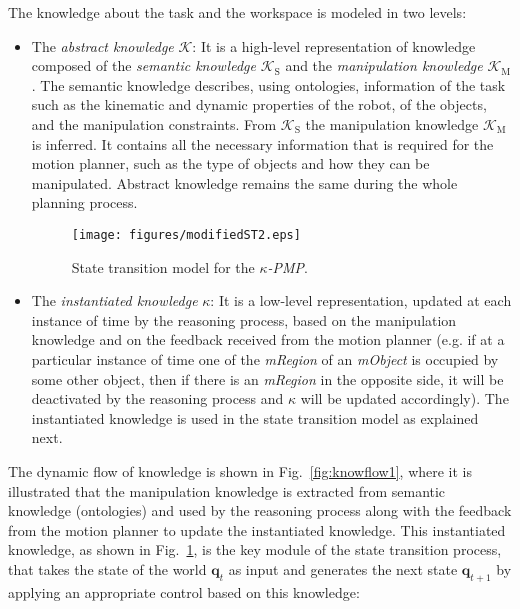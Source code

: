 \documentclass[twocolumn]{svjour3}          %
\begin{document}
The knowledge about the task and the workspace is modeled in two levels:
\begin{itemize}
\item The \textit{abstract knowledge} $\mathcal{K}$: It is a high-level representation of knowledge composed of the \textit{semantic knowledge} $\mathcal{K}_\textrm{S}$ and the  \textit{manipulation 
knowledge} $\mathcal{K}_\textrm{M}$. The semantic knowledge describes, using ontologies, information of the task such as the kinematic and dynamic properties of the robot, of the objects, and the manipulation constraints. From $\mathcal{K}_\textrm{S}$ the manipulation knowledge $\mathcal{K}_\textrm{M}$ is inferred. It contains all the necessary information that is required for the motion planner, such as the type of objects and how they can be manipulated. Abstract knowledge remains the same during the whole planning process.
\begin{figure}[t]
\begin{center}
   \texttt{[image: figures/modifiedST2.eps]}
   \caption{State transition model for the \textit{$\kappa$-PMP}.}\label{fig:propagator}
\end{center}
\end{figure}
\item The \textit{instantiated knowledge} $\kappa$: It is a low-level representation, updated at each instance of time by the reasoning process, based on the manipulation knowledge and on the feedback received from the motion planner (e.g. if at a particular instance of time one of the \textit{mRegion} of an \textit{mObject} is occupied by some other object, then if there is an \textit{mRegion} in the opposite side, it will be deactivated by the reasoning process and $\kappa$ will be updated accordingly). The instantiated knowledge is used in the state transition model as explained next.
\end{itemize}

The dynamic flow of knowledge is shown in Fig.~\ref{fig:knowflow1}, where it is illustrated that the manipulation knowledge is extracted from semantic knowledge (ontologies) and  used  by the 
reasoning process along with the feedback from the motion planner to update the instantiated knowledge. This instantiated knowledge, as shown in Fig.~\ref{fig:propagator}, is the key module of the 
state transition process, that takes the state of the world $\mathbf{q}_t$ as input and generates the next state $\mathbf{q}_{t+1}$ by applying an appropriate control
based on this knowledge:
\end{document}
